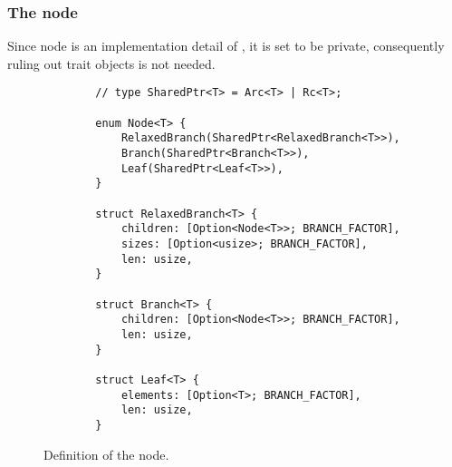 \subsubsection*{The \rrbtree{} node}
Since \rrbtree{} node is an implementation detail of \rrbtree{}, it is set to be private, consequently ruling out trait objects is not needed.

\begin{figure}[!htbp]
    \centering

    \begin{verbatim}
        // type SharedPtr<T> = Arc<T> | Rc<T>;
        
        enum Node<T> {
            RelaxedBranch(SharedPtr<RelaxedBranch<T>>),
            Branch(SharedPtr<Branch<T>>),
            Leaf(SharedPtr<Leaf<T>>),
        }
        
        struct RelaxedBranch<T> {
            children: [Option<Node<T>>; BRANCH_FACTOR],
            sizes: [Option<usize>; BRANCH_FACTOR],
            len: usize,
        }
        
        struct Branch<T> {
            children: [Option<Node<T>>; BRANCH_FACTOR],
            len: usize,
        }
        
        struct Leaf<T> {
            elements: [Option<T>; BRANCH_FACTOR],
            len: usize,
        }
    \end{verbatim}

    \caption{Definition of the \rrbtree{} node.}
    \label{fig:rrbtree-node}
\end{figure}


